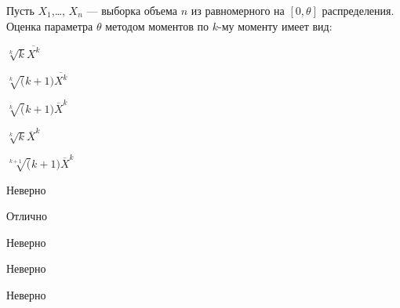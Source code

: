 
\begin{question}
Пусть \(X_1\),\ldots, \(X_n\) — выборка объема \(n\) из равномерного
на \([0, \theta]\) распределения. Оценка параметра \(\theta\) методом
моментов по \(k\)-му моменту имеет вид:
\begin{answerlist}
  \item \(\sqrt[k]k \overline{X^k}\)
  \item \(\sqrt[k](k+1) \overline{X^k}\)
  \item \(\sqrt[k](k+1) \overline{X}^k\)
  \item \(\sqrt[k]k \overline{X}^k\)
  \item \(\sqrt[k+1](k+1) \overline{X}^k\)
\end{answerlist}
\end{question}

\begin{solution}
\begin{answerlist}
  \item Неверно
  \item Отлично
  \item Неверно
  \item Неверно
  \item Неверно
\end{answerlist}
\end{solution}

